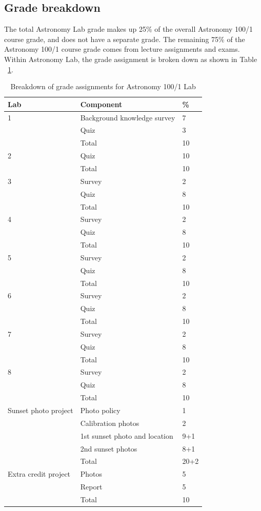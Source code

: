 \documentclass[12pt]{article}
\begin{document}
\subsection{Grade breakdown}
The total Astronomy Lab grade makes up 25\% of the overall Astronomy 100/1 course grade, and does not have a separate grade. The remaining 75\% of the Astronomy 100/1 course grade comes from lecture assignments and exams. Within Astronomy Lab, the grade assignment is broken down as shown in Table ~\ref{tab:grades}.
\begin{table}[htbp]
\centering
\caption{Breakdown of grade assignments for Astronomy 100/1 Lab}
\begin{tabular}{|l|l|l|}\hline
Lab & Component & \% \\\hline
1 & Background knowledge survey & 7 \\ 
& Quiz & 3 \\\cline{2-3}
& Total & 10 \\\hline
2 & Quiz & 10 \\\cline{2-3}
& Total & 10 \\\hline
3 & Survey & 2 \\ 
& Quiz & 8 \\\cline{2-3}
& Total & 10 \\\hline
4 & Survey & 2 \\ 
& Quiz & 8 \\\cline{2-3}
& Total & 10 \\\hline
5 & Survey & 2 \\ 
& Quiz & 8 \\\cline{2-3}
& Total & 10 \\\hline
6 & Survey & 2 \\ 
& Quiz & 8 \\\cline{2-3}
& Total & 10 \\\hline
7 & Survey & 2 \\ 
& Quiz & 8 \\\cline{2-3}
& Total & 10 \\\hline
8 & Survey & 2 \\ 
& Quiz & 8 \\\cline{2-3}
& Total & 10 \\\hline
Sunset photo project & Photo policy & 1 \\ 
& Calibration photos & 2 \\
& 1st sunset photo and location & 9+1 \\
& 2nd sunset photos & 8+1 \\\cline{2-3}
& Total & 20+2 \\\hline
Extra credit project & Photos & 5 \\ 
& Report & 5 \\\cline{2-3}
& Total & 10 \\\hline
\end{tabular}
\label{tab:grades}
\end{table}
\end{document}

